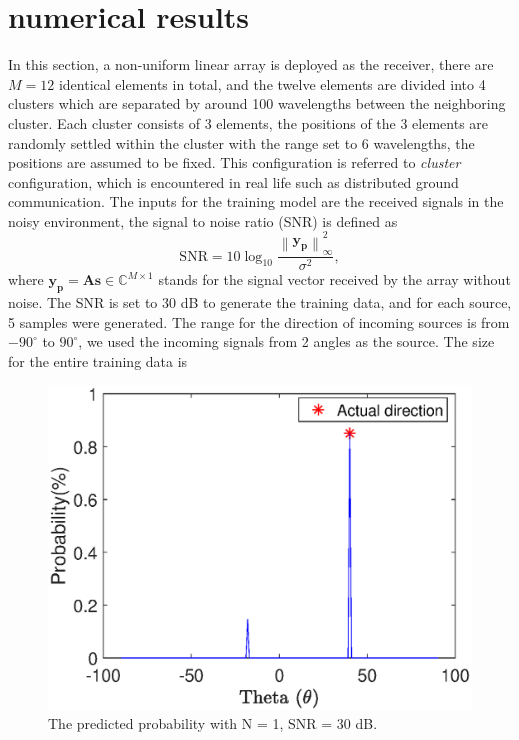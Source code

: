 \documentclass[journal]{IEEEtran}
\begin{document}
\section{numerical results} \label{results}
In this section, a non-uniform linear array is deployed as the receiver, there are $M = 12$ identical elements in total, and the twelve elements are divided into 4 clusters which are separated by around 100 wavelengths between the neighboring cluster.
Each cluster consists of 3 elements, the positions of the 3 elements are randomly settled within the cluster with the range set to 6 wavelengths, the positions are assumed to be fixed. 
This configuration is referred to \textit{cluster} configuration, which is encountered in real life such as distributed ground communication.   
The inputs for the training model are the received signals in the noisy environment, the signal to noise ratio (SNR) is defined as
\begin{equation} \label{eqt:snr}
\text{SNR} = 10\log_{10}\frac{\left \| \mathbf{y_p} \right \|^{2}_{\infty }}{\sigma^{2}},
\end{equation}
where $\mathbf{y_{p}} = \mathbf{A}\mathbf{s} \in \mathbb{C}^{M\times 1} $ stands for the signal vector received by the array without noise. 
The SNR is set to 30 dB to generate the training data, and for each source, 5 samples were generated. 
The range for the direction of incoming sources is from $-90 ^{\circ}$ to $90 ^{\circ}$, we used the incoming signals from 2 angles as the source.
The size for the entire training data is 

\begin{figure}[t]
	\centering
	\includegraphics[width=0.7\linewidth]{N_1_30dB}
	\caption{The predicted probability with N = 1, SNR = 30 dB.}
	\label{fig:N_1_30dB}
\end{figure}     
\end{document}
